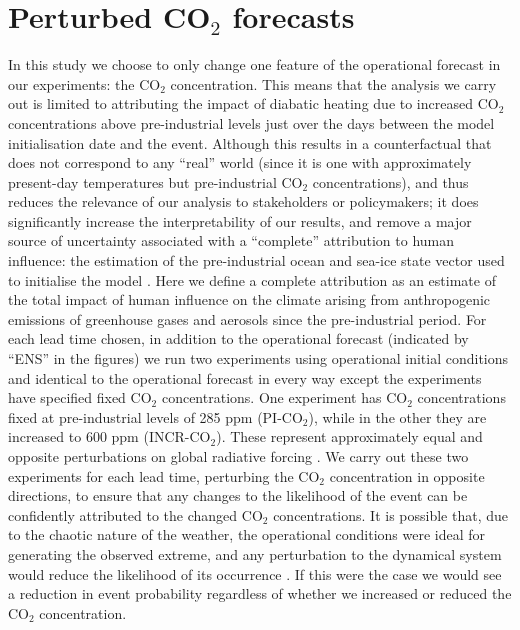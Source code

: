 \section{Perturbed CO$_2$ forecasts}\label{Ch4:experiments}

  In this study we choose to only change one feature of the operational forecast in our experiments: the CO$_2$ concentration. This means that the analysis we carry out is limited to attributing the impact of diabatic heating due to increased CO$_2$ concentrations above pre-industrial levels just over the days between the model initialisation date and the event. Although this results in a counterfactual that does not correspond to any ``real'' world (since it is one with approximately present-day temperatures but pre-industrial CO$_2$ concentrations), and thus reduces the relevance of our analysis to stakeholders or policymakers; it does significantly increase the interpretability of our results, and remove a major source of uncertainty associated with a “complete” attribution to human influence: the estimation of the pre-industrial ocean and sea-ice state vector used to initialise the model \citep{stone_benchmark_2021}. Here we define a complete attribution as an estimate of the total impact of human influence on the climate arising from anthropogenic emissions of greenhouse gases and aerosols since the pre-industrial period. For each lead time chosen, in addition to the operational forecast (indicated by ``ENS'' in the figures) we run two experiments using operational initial conditions and identical to the operational forecast in every way except the experiments have specified fixed CO$_2$ concentrations. One experiment has CO$_2$ concentrations fixed at pre-industrial levels of 285 ppm (PI-CO$_2$), while in the other they are increased to 600 ppm (INCR-CO$_2$). These represent approximately equal and opposite perturbations on global radiative forcing \citep{etminan_radiative_2016}. We carry out these two experiments for each lead time, perturbing the CO$_2$ concentration in opposite directions, to ensure that any changes to the likelihood of the event can be confidently attributed to the changed CO$_2$ concentrations. It is possible that, due to the chaotic nature of the weather, the operational conditions were ideal for generating the observed extreme, and any perturbation to the dynamical system would reduce the likelihood of its occurrence \citep{shepherd_common_2016}. If this were the case we would see a reduction in event probability regardless of whether we increased or reduced the CO$_2$ concentration.
  
